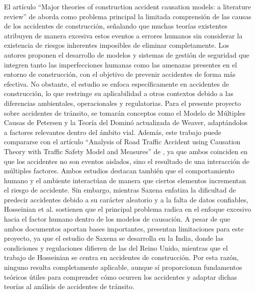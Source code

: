 \documentclass[12pt]{article}
\begin{document}
El artículo “Major theories of construction accident causation models: a literature review” de \textcite{HOSSEINIAN2012} aborda como problema principal la limitada comprensión de las causas de los accidentes de construcción, señalando que muchas teorías existentes atribuyen de manera excesiva estos eventos a errores humanos sin considerar la existencia de riesgos inherentes imposibles de eliminar completamente. Los autores proponen el desarrollo de modelos y sistemas de gestión de seguridad que integren tanto las imperfecciones humanas como las amenazas presentes en el entorno de construcción, con el objetivo de prevenir accidentes de forma más efectiva. No obstante, el estudio se enfoca específicamente en accidentes de construcción, lo que restringe su aplicabilidad a otros contextos debido a las diferencias ambientales, operacionales y regulatorias. Para el presente proyecto sobre accidentes de tránsito, se tomarán conceptos como el Modelo de Múltiples Causas de Petersen y la Teoría del Dominó actualizada de Weaver, adaptándolos a factores relevantes dentro del ámbito vial. Además, este trabajo puede compararse con el artículo “Analysis of Road Traffic Accident using Causation Theory with Traffic Safety Model and Measures” de \textcite{SAXENA2017}, ya que ambos coinciden en que los accidentes no son eventos aislados, sino el resultado de una interacción de múltiples factores. Ambos estudios destacan también que el comportamiento humano y el ambiente interactúan de manera que ciertos elementos incrementan el riesgo de accidente. Sin embargo, mientras Saxena enfatiza la dificultad de predecir accidentes debido a su carácter aleatorio y a la falta de datos confiables, Hosseinian et al. sostienen que el principal problema radica en el enfoque excesivo hacia el factor humano dentro de los modelos de causación. A pesar de que ambos documentos aportan bases importantes, presentan limitaciones para este proyecto, ya que el estudio de Saxena se desarrolla en la India, donde las condiciones y regulaciones difieren de las del Reino Unido, mientras que el trabajo de Hosseinian se centra en accidentes de construcción. Por esta razón, ninguno resulta completamente aplicable, aunque sí proporcionan fundamentos teóricos útiles para comprender cómo ocurren los accidentes y adaptar dichas teorías al análisis de accidentes de tránsito.
\end{document}
